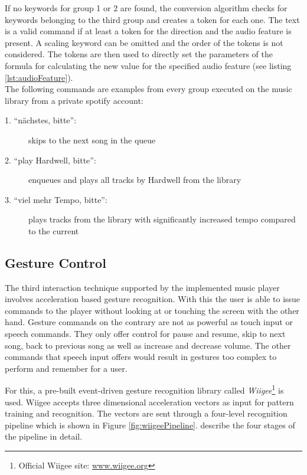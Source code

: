 If no keywords for group 1 or 2 are found, the conversion algorithm checks for keywords belonging to the third group and creates a token for each one. The text is a valid command if at least a token for the direction and the audio feature is present. A scaling keyword can be omitted and the order of the tokens is not considered. The tokens are then used to directly set the parameters of the formula for calculating the new value for the specified audio feature (see listing \ref{lst:audioFeature}).\\

The following commands are examples from every group executed on the music library from a private spotify account:
\begin{description}
	\item[1. ``n\"achstes, bitte'':] skips to the next song in the queue
	\item[2. ``play Hardwell, bitte'':] enqueues and plays all tracks by Hardwell from the library
	\item[3. ``viel mehr Tempo, bitte'':] plays tracks from the library with significantly increased tempo compared to the current
\end{description}


\subsection{Gesture Control}
The third interaction technique supported by the implemented music player involves acceleration based gesture recognition. With this the user is able to issue commands to the player without looking at or touching the screen with the other hand. Gesture commands on the contrary are not as powerful as touch input or speech commands. They only offer control for pause and resume, skip to next song, back to previous song as well as increase and decrease volume. The other commands that speech input offers would result in gestures too complex to perform and remember for a user.

For this, a pre-built event-driven gesture recognition library called \textit{Wiigee}\footnote{Official Wiigee site: \url{www.wiigee.org}} is used. Wiigee accepts three dimensional acceleration vectors as input for pattern training and recognition. The vectors are sent through a four-level recognition pipeline which is shown in Figure \ref{fig:wiigeePipeline}. \cite{Schlomer:2008:GRW:1347390.1347395} describe the four stages of the pipeline in detail.

